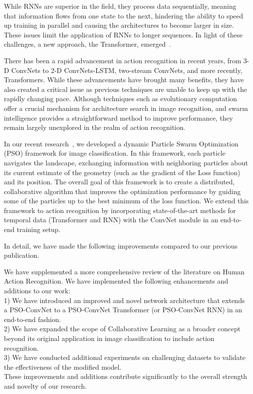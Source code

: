 \documentclass[fleqn,10pt]{wlscirep}
\begin{document}
While RNNs are superior in the field, they process data sequentially, meaning that information flows from one state to the next, hindering the ability to speed up training in parallel and causing the architectures to become larger in size. These issues limit the application of RNNs to longer sequences. In light of these challenges, a new approach, the Transformer, emerged~\cite{vaswani2017attention,touvron2021going,dosovitskiy2020image,arnab2021vivit,liu2022video}.




There has been a rapid advancement in action recognition in recent years, from 3-D ConvNets to 2-D ConvNets-LSTM, two-stream ConvNets, and more recently, Transformers. While these advancements have brought many benefits, they have also created a critical issue as previous techniques are unable to keep up with the rapidly changing pace. Although techniques such as evolutionary computation offer a crucial mechanism for architecture search in image recognition, and swarm intelligence provides a straightforward method to improve performance, they remain largely unexplored in the realm of action recognition.



In our recent research~\cite{phong2022pso}, we developed a dynamic Particle Swarm Optimization (PSO) framework for image classification. In this framework,  each particle navigates the landscape, exchanging information with neighboring particles about its current estimate of the geometry (such as  the gradient of the Loss function) and its position. The overall goal of this framework is to create a distributed, collaborative algorithm that improves the optimization performance by guiding some of the particles up to the best minimum of the loss function. We  extend this framework to action recognition by incorporating state-of-the-art methods for temporal data (Transformer and RNN) with the ConvNet module in an end-to-end training setup.

In detail, we have made the following improvements compared to our previous publication.

We have supplemented a more comprehensive review of the literature on Human Action Recognition. We have implemented the following enhancements and additions to our work:\\
1) We have introduced an improved and novel network architecture that extends a PSO-ConvNet to a PSO-ConvNet Transformer (or PSO-ConvNet RNN) in an end-to-end fashion.\\
2) We have expanded the scope of Collaborative Learning as a broader concept beyond its original application in image classification to include action recognition.\\
3) We have conducted additional experiments on challenging datasets to validate the effectiveness of the modified model.\\
These improvements and additions contribute significantly to the overall strength and novelty of our research.
\end{document}
